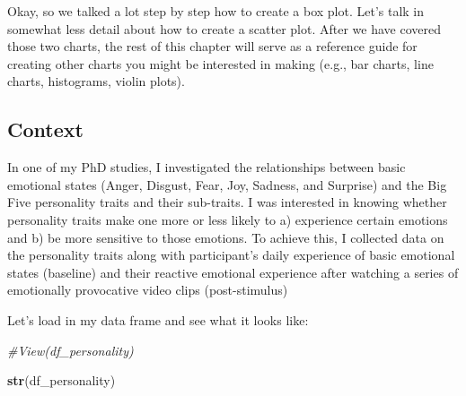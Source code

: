 \documentclass[
]{book}
\newenvironment{Shaded}{\begin{snugshade}}{\end{snugshade}}
\newcommand{\CommentTok}[1]{\textcolor[rgb]{0.56,0.35,0.01}{\textit{#1}}}
\newcommand{\FunctionTok}[1]{\textcolor[rgb]{0.13,0.29,0.53}{\textbf{#1}}}
\newcommand{\NormalTok}[1]{#1}
\begin{document}
Okay, so we talked a lot step by step how to create a box plot. Let's talk in somewhat less detail about how to create a scatter plot. After we have covered those two charts, the rest of this chapter will serve as a reference guide for creating other charts you might be interested in making (e.g., bar charts, line charts, histograms, violin plots).

\hypertarget{context}{%
\subsection{Context}\label{context}}

In one of my PhD studies, I investigated the relationships between basic emotional states (Anger, Disgust, Fear, Joy, Sadness, and Surprise) and the Big Five personality traits and their sub-traits. I was interested in knowing whether personality traits make one more or less likely to a) experience certain emotions and b) be more sensitive to those emotions. To achieve this, I collected data on the personality traits along with participant's daily experience of basic emotional states (baseline) and their reactive emotional experience after watching a series of emotionally provocative video clips (post-stimulus)

Let's load in my data frame and see what it looks like:

\begin{Shaded}
\begin{Highlighting}[]
\CommentTok{\#View(df\_personality)}

\FunctionTok{str}\NormalTok{(df\_personality)}
\end{Highlighting}
\end{Shaded}
\end{document}

